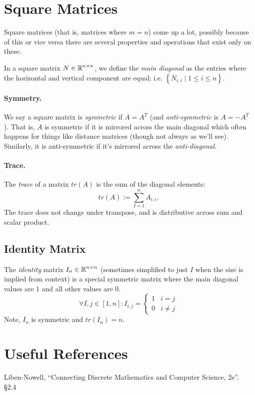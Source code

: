 \section{Square Matrices}
Square matrices (that is, matrices where $m=n$) come up a lot, 
possibly because of this or vice versa there are several properties and operations that exist only on these. 

In a square matrix $N\in\operatorname{\mathbb{R}}^{n\times n}$, we define the \emph{main diagonal} as the entries where the horizontal and vertical component are equal; 
i.e. $\left\{N_{i,i} \mid 1 \le i \le n\right\}$. 

\paragraph{Symmetry.}
We say a square matrix is \emph{symmetric} if $A=A^T$
(and \textit{anti-symmetric} is $A = -A^T$). 
That is, $A$ is symmetric if it is mirrored across the main diagonal which often happens for things like distance matrices (though not always as we'll see). 
Similarly, it is anti-symmetric if it's mirrored across the \textit{anti-diagonal}.

\paragraph{Trace. }
The \emph{trace} of a matrix $tr(A)$ is the sum of the diagonal elements: \[tr(A) := \sum_{I=1}^n A_{i,i}.\] 
The trace does not change under transpose, and is distributive across sum and scalar product. 

\subsection{Identity Matrix}

The \emph{identity} matrix $I_n \in\operatorname{\mathbb{R}}^{n\times n}$ (sometimes simplified to just $I$ when the size is implied from context) 
is a special symmetric matrix where the main diagonal values are $1$ and all other values are $0$.
\[
\forall I,j \in [1,n]: I_{i,j} = \begin{cases} 1 & i=j\\ 0 & i\ne j\end{cases}
\]
Note, $I_n$ is symmetric and $tr(I_n)=n$.


\section*{Useful References}
Liben-Nowell, ``Connecting Discrete Mathematics and Computer Science, 2e''. \S 2.4

